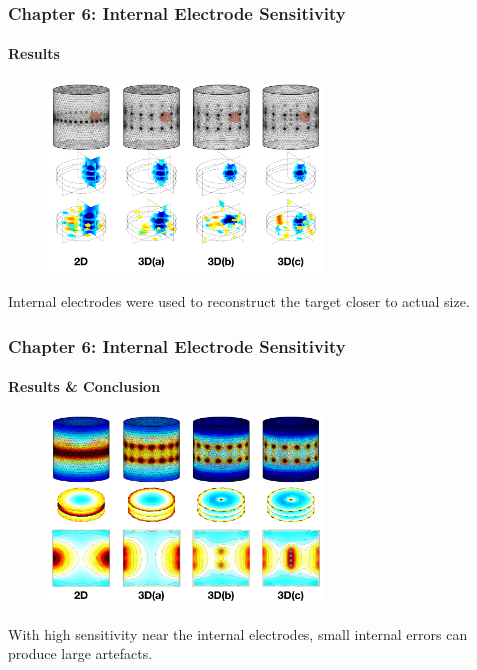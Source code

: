 \documentclass[10pt,    %
    english,            %
    xcolor=table,       %
    envcountsect,        %
    aspectratio=1610
]{beamer}
\begin{document}
\begin{frame}
	\frametitle{Chapter 6: Internal Electrode Sensitivity}
	\framesubtitle{Results}
	\begin{figure}[H]
		\centering
		\includegraphics[width=0.65\textwidth,trim={0 0.5cm 0 0cm},clip]{Image_Comparison.pdf}
	\end{figure}%
	Internal electrodes were used to reconstruct the target closer to actual size.
\end{frame}

\begin{frame}
	\frametitle{Chapter 6: Internal Electrode Sensitivity}
	\framesubtitle{Results \& Conclusion}
	\begin{figure}[H]
		\centering
		\includegraphics[width=0.65\textwidth,trim={0 0.5cm 0 0cm},clip]{Sensitivity_Comparison_new.pdf}
	\end{figure}%
	With high sensitivity near the internal electrodes, small internal errors can produce large artefacts.
\end{frame}
\end{document}

